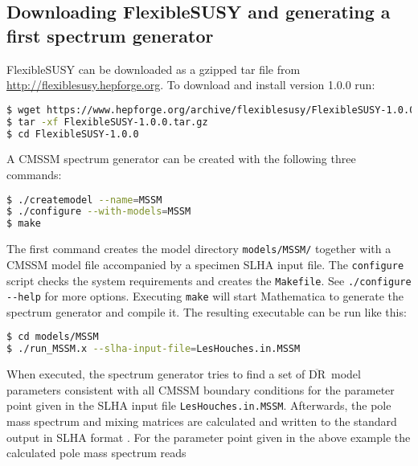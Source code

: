 \documentclass[final,3p,11pt,pdflatex]{elsarticle}
\makeatletter
\newcommand{\fs}{FlexibleSUSY\@\xspace}
\newcommand{\mathematica}{Mathematica\xspace}
\newcommand{\code}[1]{\lstinline|#1|}  %
\newcommand{\textoverline}[1]{$\overline{\mbox{#1}}$}
\newcommand{\DRbar}{\textoverline{DR}\xspace}
\makeatother
\begin{document}
\subsection{Downloading \fs and generating a first spectrum generator}
\label{sec:quick-start-cmssm}

\fs can be downloaded as a gzipped tar file from
\url{http://flexiblesusy.hepforge.org}.  To download and install
version 1.0.0 run:
%
\begin{lstlisting}[language=bash]
$ wget https://www.hepforge.org/archive/flexiblesusy/FlexibleSUSY-1.0.0.tar.gz
$ tar -xf FlexibleSUSY-1.0.0.tar.gz
$ cd FlexibleSUSY-1.0.0
\end{lstlisting}%
%
A CMSSM spectrum generator can be created with the following three
commands:
%
\begin{lstlisting}[language=bash]
$ ./createmodel --name=MSSM
$ ./configure --with-models=MSSM
$ make
\end{lstlisting}%
%
The first command creates the model directory \code{models/MSSM/}
together with a CMSSM model file accompanied by
a specimen SLHA input file.  The \code{configure} script checks
the system requirements and creates the \code{Makefile}.  See
\code{./configure --help} for more options.  Executing \code{make}
will start \mathematica to generate the spectrum generator and compile
it.  The resulting executable can be run like this:
%
\begin{lstlisting}[language=bash]
$ cd models/MSSM 
$ ./run_MSSM.x --slha-input-file=LesHouches.in.MSSM
\end{lstlisting}
%
When executed, the spectrum generator tries to find a set of \DRbar\
model parameters consistent with all CMSSM boundary conditions for the
parameter point given in the SLHA input file
\code{LesHouches.in.MSSM}.  Afterwards, the pole mass
spectrum and mixing matrices are calculated and written to the standard
output in SLHA format \cite{Skands:2003cj,Allanach:2008qq}.  For the
parameter point given in the above example the calculated pole mass
spectrum reads
%
\end{document}
